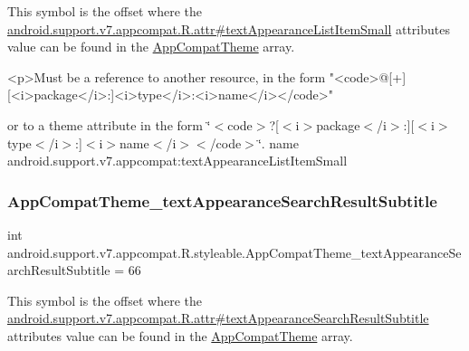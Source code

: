 This symbol is the offset where the \hyperlink{classandroid_1_1support_1_1v7_1_1appcompat_1_1R_1_1attr_aea315fe4ee810427ffa088c85d96aea3}{android.\+support.\+v7.\+appcompat.\+R.\+attr\#text\+Appearance\+List\+Item\+Small} attribute\textquotesingle{}s value can be found in the \hyperlink{classandroid_1_1support_1_1v7_1_1appcompat_1_1R_1_1styleable_a5c42f89e8a410c323be34208d75c430b}{App\+Compat\+Theme} array.

\begin{DoxyVerb}      <p>Must be a reference to another resource, in the form "<code>@[+][<i>package</i>:]<i>type</i>:<i>name</i></code>"
\end{DoxyVerb}
 or to a theme attribute in the form \char`\"{}$<$code$>$?\mbox{[}$<$i$>$package$<$/i$>$\+:\mbox{]}\mbox{[}$<$i$>$type$<$/i$>$\+:\mbox{]}$<$i$>$name$<$/i$>$$<$/code$>$\char`\"{}.  name android.\+support.\+v7.\+appcompat\+:text\+Appearance\+List\+Item\+Small \mbox{\label{classandroid_1_1support_1_1v7_1_1appcompat_1_1R_1_1styleable_a797b49953c62db18a1dff0a607fc45b1}} 
\subsubsection{\texorpdfstring{App\+Compat\+Theme\+\_\+text\+Appearance\+Search\+Result\+Subtitle}{AppCompatTheme\_textAppearanceSearchResultSubtitle}}
{\footnotesize\ttfamily int android.\+support.\+v7.\+appcompat.\+R.\+styleable.\+App\+Compat\+Theme\+\_\+text\+Appearance\+Search\+Result\+Subtitle = 66\hspace{0.3cm}{\ttfamily [static]}}

This symbol is the offset where the \hyperlink{classandroid_1_1support_1_1v7_1_1appcompat_1_1R_1_1attr_a935e2928c7cafbfb3b6843566c6719c9}{android.\+support.\+v7.\+appcompat.\+R.\+attr\#text\+Appearance\+Search\+Result\+Subtitle} attribute\textquotesingle{}s value can be found in the \hyperlink{classandroid_1_1support_1_1v7_1_1appcompat_1_1R_1_1styleable_a5c42f89e8a410c323be34208d75c430b}{App\+Compat\+Theme} array.

